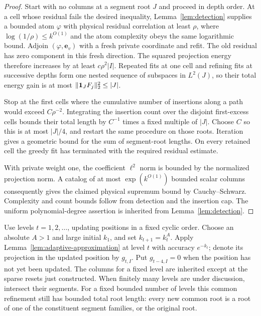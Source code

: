 \begin{proof}
Start with no columns at a segment root $J$ and proceed in depth
order.  At a cell whose residual fails the desired inequality,
Lemma~\ref{lem:detection} supplies a bounded atom $\varphi$ with
physical residual correlation at least $\rho$, where
$\log(1/\rho)\le k^{O(1)}$ and the atom complexity obeys the same
logarithmic bound.  Adjoin
$(\varphi,\mathbf e_v)$ with a fresh private coordinate and refit.
The old residual has zero component in this fresh direction.
The squared projection energy therefore increases by at least
$c\rho^2|I|$.  Repeated fits at one cell and refining fits at successive
depths form one nested sequence of subspaces in $L^2(J)$, so their
total energy gain is at most $\|\mathbf 1_JF_j\|_2^2\le|J|$.

Stop at the first cells where the cumulative number of insertions
along a path would exceed $C\rho^{-2}$.  Integrating the insertion
count over the disjoint first-excess cells bounds their total length
by $C^{-1}$ times a fixed multiple of $|J|$.  Choose $C$ so this is
at most $|J|/4$, and restart the same procedure on those roots.
Iteration gives a geometric bound for the sum of segment-root
lengths.  On every retained cell the greedy fit has terminated with
the required residual estimate.

With private weight one, the coefficient $\ell^2$ norm is bounded
by the normalized projection norm.  A catalog of at most
$\exp(k^{O(1)})$ bounded scalar columns consequently gives the
claimed physical supremum bound by Cauchy--Schwarz.  Complexity and
count bounds follow from detection and the insertion cap.  The
uniform polynomial-degree assertion is inherited from
Lemma~\ref{lem:detection}.
\end{proof}

Use levels $t=1,2,\ldots$, updating positions in a fixed cyclic
order.  Choose an absolute $A>1$ and large initial $k_1$, and set
$k_{t+1}=k_t^A$.  Apply Lemma~\ref{lem:adaptive-approximation}
at level $t$ with accuracy $e^{-k_t}$; denote its projection in
the updated position by $g_{t,I}$.  Put $g_{t-4,I}=0$ when the
position has not yet been updated.  The columns for a fixed level
are inherited except at the sparse resets just constructed.
When finitely many levels are under discussion, intersect their
segments.  For a fixed bounded number of levels this common
refinement still has bounded total root length: every new common
root is a root of one of the constituent segment families, or the
original root.

